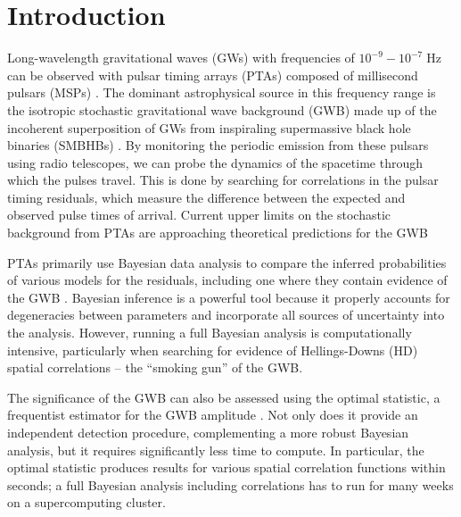 \documentclass[twocolumn,aps,prd,superscriptaddress]{revtex4-1}
\begin{document}
\maketitle


\section{Introduction}

Long-wavelength gravitational waves (GWs) with frequencies of 
$10^{-9} - 10^{-7} \; \mathrm{Hz}$ can be observed with pulsar timing arrays (PTAs) 
composed of millisecond pulsars (MSPs) \cite{hd1983,fb1990}. 
The dominant astrophysical source in this frequency range is the isotropic stochastic 
gravitational wave background (GWB) 
made up of the incoherent superposition of GWs from inspiraling 
supermassive black hole binaries (SMBHBs) 
\citep{1995ApJ...446..543R, 2003ApJ...583..616J, 2003ApJ...590..691W}. 
By monitoring the periodic emission from these pulsars using radio telescopes, 
we can probe the dynamics of the spacetime through which the pulses travel. 
This is done by searching for correlations in the pulsar timing residuals, 
which measure the difference between the expected and observed pulse times of arrival. 
Current upper limits on the stochastic background from PTAs are approaching 
theoretical predictions for the GWB \citep{PPTA2013,EPTA2015,abb+17b}

PTAs primarily use Bayesian data analysis to compare the inferred probabilities 
of various models for the residuals, 
including one where they contain evidence of the GWB 
\citep{vlm+2009,lah+2013}. 
Bayesian inference is a powerful tool because 
it properly accounts for degeneracies between parameters 
and incorporate all sources of uncertainty into the analysis. 
However, running a full Bayesian analysis is computationally intensive, 
particularly when searching for evidence of Hellings-Downs (HD) spatial correlations --
the ``smoking gun'' of the GWB.

The significance of the GWB can also be assessed using the 
optimal statistic, a frequentist estimator for the GWB amplitude \citep{abc+2009,demorest+2013,ccs+2015}. 
Not only does it provide an independent detection procedure, complementing a more robust Bayesian analysis, but it requires significantly less time to compute. In particular, the optimal statistic produces results for various spatial correlation functions within seconds; a full Bayesian analysis including correlations has to run for many weeks on a supercomputing cluster. 
\end{document}
